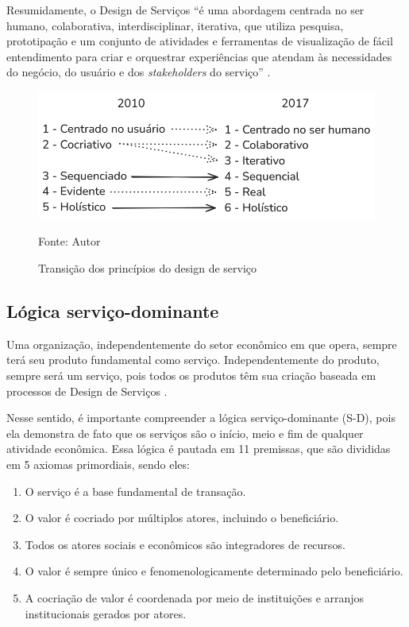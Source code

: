 Resumidamente, o Design de Serviços ``é uma abordagem centrada no ser humano, colaborativa, interdisciplinar, iterativa, que utiliza pesquisa, prototipação e um conjunto de atividades e ferramentas de visualização de fácil entendimento para criar e orquestrar experiências que atendam às necessidades do negócio, do usuário e dos \textit{stakeholders} do serviço'' \cite{Stickdorn2019}.

\begin{figure}[h]
	\centering %
	\includegraphics[width=16cm]{figuras/principios.png} %
	\caption{Transição dos princípios do design de serviço}
	Fonte: Autor
	\label{figura:qualquernome}
\end{figure}

\subsection{Lógica serviço-dominante}

Uma organização, independentemente do setor econômico em que opera, sempre terá seu produto fundamental como serviço. Independentemente do produto, sempre será um serviço, pois todos os produtos têm sua criação baseada em processos de Design de Serviços \cite{Stickdorn2019}.

Nesse sentido, é importante compreender a lógica serviço-dominante (S-D), pois ela demonstra de fato que os serviços são o início, meio e fim de qualquer atividade econômica. Essa lógica é pautada em 11 premissas, que são divididas em 5 axiomas primordiais, sendo eles:

\begin{enumerate}
	\item O serviço é a base fundamental de transação.
	\item O valor é cocriado por múltiplos atores, incluindo o beneficiário.
	\item Todos os atores sociais e econômicos são integradores de recursos.
	\item O valor é sempre único e fenomenologicamente determinado pelo beneficiário.
	\item A cocriação de valor é coordenada por meio de instituições e arranjos institucionais gerados por atores.
\end{enumerate}

